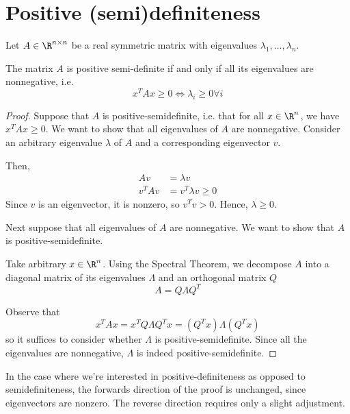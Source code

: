 \documentclass[11pt,letterpaper]{article}
\begin{document}
\section{Positive (semi)definiteness}

Let $A \in \R^{n \times n}$ be a real symmetric matrix with eigenvalues
$\lambda_1, \ldots, \lambda_n$.

\begin{prop}
    The matrix $A$ is positive semi-definite if and only if all its eigenvalues
    are nonnegative, i.e.
    \begin{equation*}
        x^T A x \geq 0 \iff \lambda_i \geq 0 \forall i
    \end{equation*}
\end{prop}

\begin{proof}
    Suppose that $A$ is positive-semidefinite,
    i.e. that for all $x \in \R^n$, we have $x^T A x \geq 0$.
    We want to show that all eigenvalues of $A$ are nonnegative.
    Consider an arbitrary eigenvalue $\lambda$ of $A$ and a corresponding
    eigenvector $v$.

    Then,
    \begin{align*}
        A v &= \lambda v \\
        v^T A v &= v^T \lambda v \geq 0
    \end{align*}
    Since $v$ is an eigenvector, it is nonzero, so $v^T v > 0$.
    Hence, $\lambda \geq 0$.

    Next suppose that all eigenvalues of $A$ are nonnegative.
    We want to show that $A$ is positive-semidefinite.

    Take arbitrary $x \in \R^n$.
    Using the Spectral Theorem, we decompose $A$ into a diagonal matrix of its
    eigenvalues $\Lambda$ and an orthogonal matrix $Q$
    \begin{equation*}
        A = Q \Lambda Q^T
    \end{equation*}

    Observe that
    \begin{equation*}
        x^T A x = x^T Q \Lambda Q^T x = (Q^T x) \Lambda (Q^T x)
    \end{equation*}
    so it suffices to consider whether $\Lambda$ is positive-semidefinite.
    Since all the eigenvalues are nonnegative, $\Lambda$ is indeed
    positive-semidefinite.
\end{proof}

In the case where we're interested in positive-definiteness as opposed to
semidefiniteness, the forwards direction of the proof is unchanged, since
eigenvectors are nonzero. The reverse direction requires only a slight
adjustment.
\end{document}
